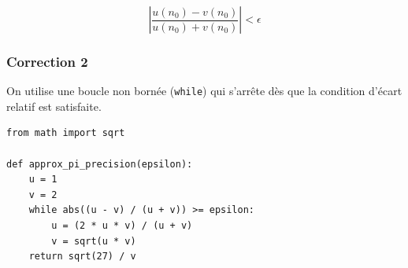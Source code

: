 \documentclass[11pt,a4paper]{article}
\begin{document}
$$
\left| \frac{u(n_0) - v(n_0)}{u(n_0) + v(n_0)} \right| < \epsilon
$$

\subsubsection*{Correction 2}
On utilise une boucle non bornée (\texttt{while}) qui s'arrête dès que la condition d'écart relatif est satisfaite.

\begin{verbatim}
from math import sqrt

def approx_pi_precision(epsilon):
    u = 1
    v = 2
    while abs((u - v) / (u + v)) >= epsilon:
        u = (2 * u * v) / (u + v)
        v = sqrt(u * v)
    return sqrt(27) / v
\end{verbatim}
\end{document}
